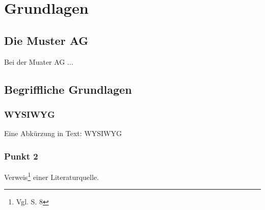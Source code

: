 
\chapter{Grundlagen} %



\section{Die Muster AG} %
Bei der Muater AG ...


\section{Begriffliche Grundlagen} %
\subsection{WYSIWYG}
Eine Abkürzung in Text: \acs{WYSIWYG}

\subsection{Punkt 2}
Verweis\footnote{Vgl. \cite{Baranauskas.2007} S. 8} einer Literaturquelle.

